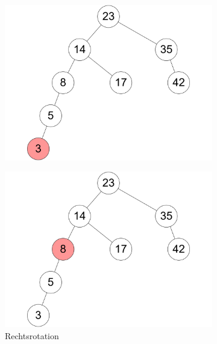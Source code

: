 \documentclass[11pt,a4paper]{article}
\begin{document}
\begin{loesung}
\begin{enumerate}
\begin{figure}[h!]
\begin{subfigure}[b]{0.23\textwidth}
                \caption*{}
            \end{subfigure}
            \\
            \begin{subfigure}[b]{0.23\textwidth}
                \centering
                \includegraphics[width=\textwidth]{img/3a_3}
                \caption*{}
            \end{subfigure}
            \begin{subfigure}[b]{0.23\textwidth}
                \centering
                \includegraphics[width=\textwidth]{img/3a_4}
                \caption*{Rechtsrotation}
            \end{subfigure}
            \begin{subfigure}[b]{0.23\textwidth}

\end{subfigure}
\end{figure}
\end{enumerate}
\end{loesung}
\end{document}
